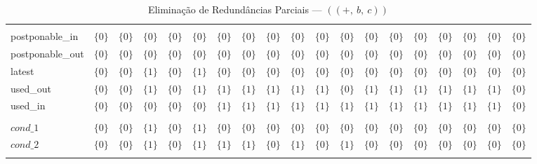 \begin{table}[ht]
\begin{tabular}{l|c|c|c|c|c|c|c|c|c|c|c|c|c|c|c|c|c|c}
 &  &  &  &  &  &  &  &  &  &  &  &  &  &  &  &  &  &  \\
postponable\_in & $\{0\}$ & $\{0\}$ & $\{0\}$ & $\{0\}$ & $\{0\}$ & $\{0\}$ & $\{0\}$ & $\{0\}$ & $\{0\}$ & $\{0\}$ & $\{0\}$ & $\{0\}$ & $\{0\}$ & $\{0\}$ & $\{0\}$ & $\{0\}$ & $\{0\}$ & $\{0\}$ \\
postponable\_out & $\{0\}$ & $\{0\}$ & $\{0\}$ & $\{0\}$ & $\{0\}$ & $\{0\}$ & $\{0\}$ & $\{0\}$ & $\{0\}$ & $\{0\}$ & $\{0\}$ & $\{0\}$ & $\{0\}$ & $\{0\}$ & $\{0\}$ & $\{0\}$ & $\{0\}$ & $\{0\}$ \\
latest & $\{0\}$ & $\{0\}$ & $\{1\}$ & $\{0\}$ & $\{1\}$ & $\{0\}$ & $\{0\}$ & $\{0\}$ & $\{0\}$ & $\{0\}$ & $\{0\}$ & $\{0\}$ & $\{0\}$ & $\{0\}$ & $\{0\}$ & $\{0\}$ & $\{0\}$ & $\{0\}$ \\
used\_out & $\{0\}$ & $\{0\}$ & $\{1\}$ & $\{0\}$ & $\{1\}$ & $\{1\}$ & $\{1\}$ & $\{1\}$ & $\{1\}$ & $\{1\}$ & $\{0\}$ & $\{1\}$ & $\{1\}$ & $\{1\}$ & $\{1\}$ & $\{1\}$ & $\{1\}$ & $\{0\}$ \\
used\_in & $\{0\}$ & $\{0\}$ & $\{0\}$ & $\{0\}$ & $\{0\}$ & $\{1\}$ & $\{1\}$ & $\{1\}$ & $\{1\}$ & $\{1\}$ & $\{1\}$ & $\{1\}$ & $\{1\}$ & $\{1\}$ & $\{1\}$ & $\{1\}$ & $\{1\}$ & $\{0\}$ \\
 &  &  &  &  &  &  &  &  &  &  &  &  &  &  &  &  &  &  \\
$cond\_1$ & $\{0\}$ & $\{0\}$ & $\{1\}$ & $\{0\}$ & $\{1\}$ & $\{0\}$ & $\{0\}$ & $\{0\}$ & $\{0\}$ & $\{0\}$ & $\{0\}$ & $\{0\}$ & $\{0\}$ & $\{0\}$ & $\{0\}$ & $\{0\}$ & $\{0\}$ & $\{0\}$ \\
$cond\_2$ & $\{0\}$ & $\{0\}$ & $\{1\}$ & $\{0\}$ & $\{1\}$ & $\{1\}$ & $\{1\}$ & $\{0\}$ & $\{1\}$ & $\{0\}$ & $\{1\}$ & $\{0\}$ & $\{0\}$ & $\{0\}$ & $\{0\}$ & $\{0\}$ & $\{0\}$ & $\{0\}$ \\
\\
\end{tabular}
\caption{Elimina\c{c}\~ao de Redund\^ancias Parciais --- $((+,\:b,\:c))$}
\end{table}



